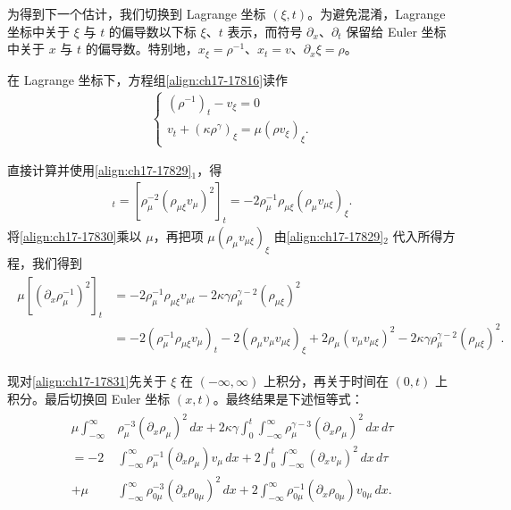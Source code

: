 \documentclass[../../main.tex]{subfiles}
\begin{document}
为得到下一个估计，我们切换到 Lagrange 坐标 $(\xi,t)$。为避免混淆，Lagrange 坐标中关于 $\xi$ 与 $t$ 的偏导数以下标 $\xi$、$t$ 表示，而符号 $\partial_x$、$\partial_t$ 保留给 Euler 坐标中关于 $x$ 与 $t$ 的偏导数。特别地，$x_\xi=\rho^{-1}$、$x_t=v$、$\partial_x\xi=\rho$。

在 Lagrange 坐标下，方程组\eqref{align:ch17-17816}读作
\begin{align}
\begin{cases}
(\rho^{-1})_t-v_\xi=0\\
v_t+(\kappa\rho^\gamma)_\xi=\mu(\rho v_\xi)_\xi.
\end{cases}
\label{align:ch17-17829}
\end{align}

直接计算并使用\eqref{align:ch17-17829}$_1$，得
\begin{align}
[(\partial_x\rho_\mu^{-1})^2]_t=[\rho_\mu^{-2}(\rho_{\mu\xi}v_\mu)^2]_t=-2\rho_\mu^{-1}\rho_{\mu\xi}(\rho_\mu v_{\mu\xi})_\xi.
\label{align:ch17-17830}
\end{align}
将\eqref{align:ch17-17830}乘以 $\mu$，再把项 $\mu(\rho_\mu v_{\mu\xi})_\xi$ 由\eqref{align:ch17-17829}$_2$ 代入所得方程，我们得到
\begin{align}
\begin{split}
\mu[(\partial_x\rho_\mu^{-1})^2]_t&=-2\rho_\mu^{-1}\rho_{\mu\xi}v_{\mu t}-2\kappa\gamma\rho_\mu^{\gamma-2}(\rho_{\mu\xi})^2\\
&=-2(\rho_\mu^{-1}\rho_{\mu\xi}v_\mu)_t-2(\rho_\mu v_\mu v_{\mu\xi})_\xi+2\rho_\mu(v_\mu v_{\mu\xi})^2-2\kappa\gamma\rho_\mu^{\gamma-2}(\rho_{\mu\xi})^2.
\end{split}
\label{align:ch17-17831}
\end{align}

现对\eqref{align:ch17-17831}先关于 $\xi$ 在 $(-\infty,\infty)$ 上积分，再关于时间在 $(0,t)$ 上积分。最后切换回 Euler 坐标 $(x,t)$。最终结果是下述恒等式：
\begin{align}
\begin{split}
\mu\int_{-\infty}^\infty&\rho_\mu^{-3}(\partial_x\rho_\mu)^2\,dx+2\kappa\gamma\int_0^t\int_{-\infty}^\infty\rho_\mu^{\gamma-3}(\partial_x\rho_\mu)^2\,dx\,d\tau\\
=-2&\int_{-\infty}^\infty\rho_\mu^{-1}(\partial_x\rho_\mu)v_\mu\,dx+2\int_0^t\int_{-\infty}^\infty(\partial_xv_\mu)^2\,dx\,d\tau\\
+\mu&\int_{-\infty}^\infty\rho_{0\mu}^{-3}(\partial_x\rho_{0\mu})^2\,dx+2\int_{-\infty}^\infty\rho_{0\mu}^{-1}(\partial_x\rho_{0\mu})v_{0\mu}\,dx.
\end{split}
\label{align:ch17-17832}
\end{align}
\end{document}
